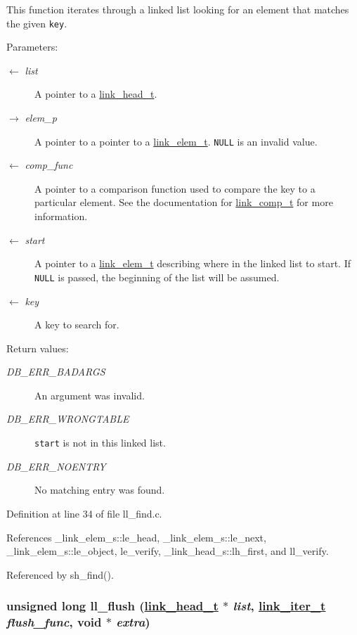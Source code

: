 This function iterates through a linked list looking for an element that matches the given {\tt key}.

\begin{Desc}
\item[Parameters:]
\begin{description}
\item[\mbox{$\leftarrow$} {\em list}]A pointer to a \hyperlink{group__dbprim__link_ga0}{link\_\-head\_\-t}. \item[\mbox{$\rightarrow$} {\em elem\_\-p}]A pointer to a pointer to a \hyperlink{group__dbprim__link_ga1}{link\_\-elem\_\-t}. {\tt NULL} is an invalid value. \item[\mbox{$\leftarrow$} {\em comp\_\-func}]A pointer to a comparison function used to compare the key to a particular element. See the documentation for \hyperlink{group__dbprim__link_ga3}{link\_\-comp\_\-t} for more information. \item[\mbox{$\leftarrow$} {\em start}]A pointer to a \hyperlink{group__dbprim__link_ga1}{link\_\-elem\_\-t} describing where in the linked list to start. If {\tt NULL} is passed, the beginning of the list will be assumed. \item[\mbox{$\leftarrow$} {\em key}]A key to search for.\end{description}
\end{Desc}
\begin{Desc}
\item[Return values:]
\begin{description}
\item[{\em DB\_\-ERR\_\-BADARGS}]An argument was invalid. \item[{\em DB\_\-ERR\_\-WRONGTABLE}]{\tt start} is not in this linked list. \item[{\em DB\_\-ERR\_\-NOENTRY}]No matching entry was found.\end{description}
\end{Desc}


Definition at line 34 of file ll\_\-find.c.

References \_\-link\_\-elem\_\-s::le\_\-head, \_\-link\_\-elem\_\-s::le\_\-next, \_\-link\_\-elem\_\-s::le\_\-object, le\_\-verify, \_\-link\_\-head\_\-s::lh\_\-first, and ll\_\-verify.

Referenced by sh\_\-find().\hypertarget{group__dbprim__link_ga11}{
\subsubsection[ll\_\-flush]{\setlength{\rightskip}{0pt plus 5cm}unsigned long ll\_\-flush (\hyperlink{struct__link__head__s}{link\_\-head\_\-t} $\ast$ {\em list}, \hyperlink{group__dbprim__link_ga2}{link\_\-iter\_\-t} {\em flush\_\-func}, void $\ast$ {\em extra})}}
\label{group__dbprim__link_ga11}


